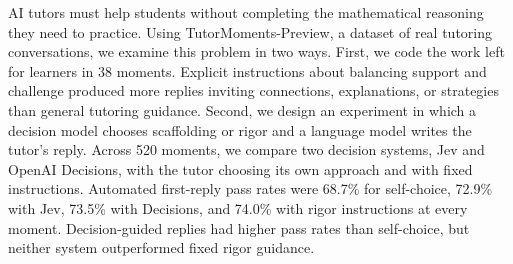 AI tutors must help students without completing the mathematical reasoning they need to practice. Using TutorMoments-Preview, a dataset of real tutoring conversations, we examine this problem in two ways. First, we code the work left for learners in 38 moments. Explicit instructions about balancing support and challenge produced more replies inviting connections, explanations, or strategies than general tutoring guidance. Second, we design an experiment in which a decision model chooses scaffolding or rigor and a language model writes the tutor's reply. Across 520 moments, we compare two decision systems, Jev and OpenAI Decisions, with the tutor choosing its own approach and with fixed instructions. Automated first-reply pass rates were 68.7\% for self-choice, 72.9\% with Jev, 73.5\% with Decisions, and 74.0\% with rigor instructions at every moment. Decision-guided replies had higher pass rates than self-choice, but neither system outperformed fixed rigor guidance.
